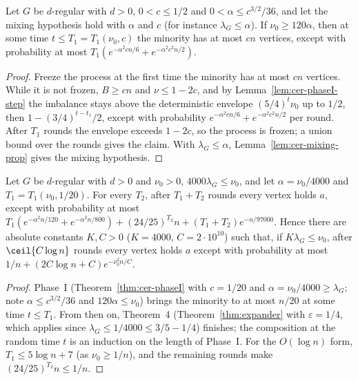 \begin{theorem}\label{thm:cer-phaseI}
\leanok{}
Let $G$ be $d$-regular with $d>0$, $0<c\le1/2$ and $0<\alpha\le c^{3/2}/36$, and let the mixing
hypothesis hold with $\alpha$ and $c$ (for instance $\lambda_G\le\alpha$). If $\nu_0\ge120\alpha$,
then at some time $t\le T_1=T_1(\nu_0,c)$ the minority has at most $cn$ vertices, except with
probability at most $T_1(e^{-\alpha^2cn/6}+e^{-\alpha^2c^2n/2})$.
\end{theorem}
\begin{proof}\leanok
Freeze the process at the first time the minority has at most $cn$ vertices. While it is not
frozen, $B\ge cn$ and $\nu\le1-2c$, and by Lemma~\ref{lem:cer-phaseI-step} the imbalance stays
above the deterministic envelope $(5/4)^t\nu_0$ up to $1/2$, then $1-(3/4)^{t-t_1}/2$, except
with probability $e^{-\alpha^2cn/6}+e^{-\alpha^2c^2n/2}$ per round. After $T_1$ rounds the envelope
exceeds $1-2c$, so the process is frozen; a union bound over the rounds gives the claim. With
$\lambda_G\le\alpha$, Lemma~\ref{lem:cer-mixing-prop} gives the mixing hypothesis.
\end{proof}

\begin{theorem}\label{thm:cer-theorem2}
\leanok{}
Let $G$ be $d$-regular with $d>0$ and $\nu_0>0$, $4000\lambda_G\le\nu_0$, and let
$\alpha=\nu_0/4000$ and $T_1=T_1(\nu_0,1/20)$. For every $T_2$, after $T_1+T_2$ rounds every
vertex holds $a$, except with probability at most
$T_1(e^{-\alpha^2n/120}+e^{-\alpha^2n/800})+(24/25)^{T_2}n+(T_1+T_2)e^{-n/97000}$. Hence there are
absolute constants $K,C>0$ ($K=4000$, $C=2\cdot10^{10}$) such that, if $K\lambda_G\le\nu_0$,
after $\ceil{C\log n}$ rounds every vertex holds $a$ except with probability at most
$1/n+(2C\log n+C)e^{-\nu_0^2n/C}$.
\end{theorem}
\begin{proof}\leanok
Phase~I (Theorem~\ref{thm:cer-phaseI} with $c=1/20$ and $\alpha=\nu_0/4000\ge\lambda_G$; note
$\alpha\le c^{3/2}/36$ and $120\alpha\le\nu_0$) brings the minority to at most $n/20$ at some time
$t\le T_1$. From then on, Theorem~4 (Theorem~\ref{thm:expander} with $\varepsilon=1/4$, which
applies since $\lambda_G\le1/4000\le3/5-1/4$) finishes; the composition at the random time $t$ is
an induction on the length of Phase~I. For the $O(\log n)$ form, $T_1\le5\log n+7$ (as
$\nu_0\ge1/n$), and the remaining rounds make $(24/25)^{T_2}n\le1/n$.
\end{proof}

